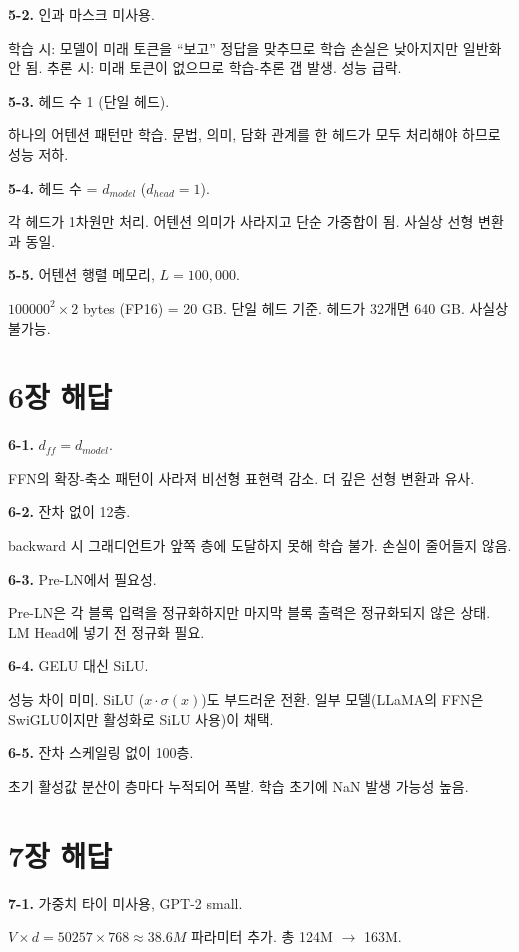 \textbf{5-2.} 인과 마스크 미사용.

학습 시: 모델이 미래 토큰을 ``보고'' 정답을 맞추므로 학습 손실은 낮아지지만 일반화 안 됨.
추론 시: 미래 토큰이 없으므로 학습-추론 갭 발생. 성능 급락.

\textbf{5-3.} 헤드 수 1 (단일 헤드).

하나의 어텐션 패턴만 학습. 문법, 의미, 담화 관계를 한 헤드가 모두 처리해야 하므로 성능 저하.

\textbf{5-4.} 헤드 수 = $d_{model}$ ($d_{head}=1$).

각 헤드가 1차원만 처리. 어텐션 의미가 사라지고 단순 가중합이 됨. 사실상 선형 변환과 동일.

\textbf{5-5.} 어텐션 행렬 메모리, $L=100,000$.

$100000^2 \times 2$ bytes (FP16) = 20 GB. 단일 헤드 기준. 헤드가 32개면 640 GB. 사실상 불가능.

\section{6장 해답}

\textbf{6-1.} $d_{ff} = d_{model}$.

FFN의 확장-축소 패턴이 사라져 비선형 표현력 감소. 더 깊은 선형 변환과 유사.

\textbf{6-2.} 잔차 없이 12층.

backward 시 그래디언트가 앞쪽 층에 도달하지 못해 학습 불가. 손실이 줄어들지 않음.

\textbf{6-3.} Pre-LN에서  필요성.

Pre-LN은 각 블록 입력을 정규화하지만 마지막 블록 출력은 정규화되지 않은 상태. LM Head에 넣기 전 정규화 필요.

\textbf{6-4.} GELU 대신 SiLU.

성능 차이 미미. SiLU ($x \cdot \sigma(x)$)도 부드러운 전환. 일부 모델(LLaMA의 FFN은 SwiGLU이지만 활성화로 SiLU 사용)이 채택.

\textbf{6-5.} 잔차 스케일링 없이 100층.

초기 활성값 분산이 층마다 누적되어 폭발. 학습 초기에 NaN 발생 가능성 높음.

\section{7장 해답}

\textbf{7-1.} 가중치 타이 미사용, GPT-2 small.

$V \times d = 50257 \times 768 \approx 38.6M$ 파라미터 추가. 총 124M $\to$ 163M.

